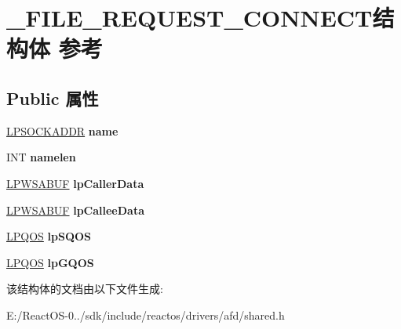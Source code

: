 \hypertarget{struct___f_i_l_e___r_e_q_u_e_s_t___c_o_n_n_e_c_t}{}\section{\+\_\+\+F\+I\+L\+E\+\_\+\+R\+E\+Q\+U\+E\+S\+T\+\_\+\+C\+O\+N\+N\+E\+C\+T结构体 参考}
\label{struct___f_i_l_e___r_e_q_u_e_s_t___c_o_n_n_e_c_t}
\subsection*{Public 属性}
\begin{DoxyCompactItemize}
\item 
\mbox{\label{struct___f_i_l_e___r_e_q_u_e_s_t___c_o_n_n_e_c_t_a2d61e007721cb18e736e27f1ee13e853}} 
\hyperlink{structsockaddr}{L\+P\+S\+O\+C\+K\+A\+D\+DR} {\bfseries name}
\item 
\mbox{\label{struct___f_i_l_e___r_e_q_u_e_s_t___c_o_n_n_e_c_t_a4ec99d7553eeb773a8c84ced580bede5}} 
I\+NT {\bfseries namelen}
\item 
\mbox{\label{struct___f_i_l_e___r_e_q_u_e_s_t___c_o_n_n_e_c_t_a84c7b84d1efc47d9a590bf90d0dac9ee}} 
\hyperlink{struct___w_s_a_b_u_f}{L\+P\+W\+S\+A\+B\+UF} {\bfseries lp\+Caller\+Data}
\item 
\mbox{\label{struct___f_i_l_e___r_e_q_u_e_s_t___c_o_n_n_e_c_t_a730a5fe27249a0f0c8edade6904d5aae}} 
\hyperlink{struct___w_s_a_b_u_f}{L\+P\+W\+S\+A\+B\+UF} {\bfseries lp\+Callee\+Data}
\item 
\mbox{\label{struct___f_i_l_e___r_e_q_u_e_s_t___c_o_n_n_e_c_t_aa31b45addebbba290a40adcdaacbb53c}} 
\hyperlink{struct___quality_of_service}{L\+P\+Q\+OS} {\bfseries lp\+S\+Q\+OS}
\item 
\mbox{\label{struct___f_i_l_e___r_e_q_u_e_s_t___c_o_n_n_e_c_t_a379f05f3c6c4b4367659107ff27327b7}} 
\hyperlink{struct___quality_of_service}{L\+P\+Q\+OS} {\bfseries lp\+G\+Q\+OS}
\end{DoxyCompactItemize}


该结构体的文档由以下文件生成\+:\begin{DoxyCompactItemize}
\item 
E\+:/\+React\+O\+S-\/0../sdk/include/reactos/drivers/afd/shared.\+h\end{DoxyCompactItemize}
